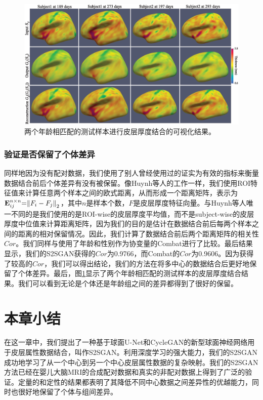\begin{figure}[t]
	\centering
	\includegraphics[width=\linewidth]{figure/s2sgan_examples.eps}
	\caption{两个年龄相匹配的测试样本进行皮层厚度结合的可视化结果。}\label{fig:s2sgan_examples}
\end{figure} 
	
\subsubsection{验证是否保留了个体差异}
同样地因为没有配对数据，我们使用了别人曾经使用过的证实为有效的指标来衡量数据结合前后个体差异有没有被保留。像Huynh等人\cite{huynh2019multi}的工作一样，我们使用ROI特征值来计算任意两个样本之间的欧式距离，从而形成一个距离矩阵，表示为${\bf{E}}_{ij}^{n \times n}{\rm{ = }}{\left\| {{F_i} - {F_j}} \right\|_{\rm{2}}}$，其中$n$是样本个数，$F$是皮层厚度特征向量。与Huynh等人\cite{huynh2019multi}唯一不同的是我们使用的是ROI-wise的皮层厚度平均值，而不是subject-wise的皮层厚度中位值来计算距离矩阵，因为我们的目的是估计在数据结合前后每两个样本之间的距离的相对保留情况。因此，我们计算了数据结合前后两个距离矩阵的相关性$Cor$。我们同样与使用了年龄和性别作为协变量的Combat进行了比较。最后结果显示，我们的S2SGAN获得的$Cor$为0.9766，而Combat的$Cor$为0.9606。因为获得了较高的$Cor$，我们可以得出结论，我们的方法在将多中心的数据结合后更好地保留了个体差异。最后，图\ref{fig:s2sgan_examples}显示了两个年龄相匹配的测试样本的皮层厚度结合结果。我们可以看到无论是个体还是年龄组之间的差异都得到了很好的保留。

\section{本章小结}
在这一章中，我们提出了一种基于球面U-Net和CycleGAN的新型球面神经网络用于皮层属性数据结合，叫作S2SGAN。利用深度学习的强大能力，我们的S2SGAN成功地学习了从一个中心到另一个中心皮层属性数据的复杂映射。我们的S2SGAN方法已经在婴儿大脑MRI的合成配对数据和真实的非配对数据上得到了广泛的验证。定量的和定性的结果都表明了其降低不同中心数据之间差异性的优越能力，同时也很好地保留了个体与组间差异。

